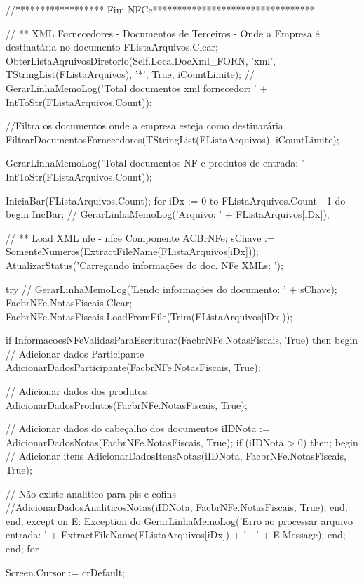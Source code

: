       //****************** Fim NFCe*********************************



   // ** XML Fornecedores - Documentos de Terceiros - Onde a Empresa é destinatária no documento
   FListaArquivos.Clear;
   ObterListaAqruivosDiretorio(Self.LocalDocXml_FORN, 'xml', TStringList(FListaArquivos), '*', True, iCountLimite);
 //  GerarLinhaMemoLog('Total documentos xml fornecedor: ' + IntToStr(FListaArquivos.Count));

   //Filtra os documentos onde a empresa esteja como destinarária
   FiltrarDocumentosFornecedores(TStringList(FListaArquivos), iCountLimite);

   GerarLinhaMemoLog('Total documentos NF-e produtos de entrada: ' + IntToStr(FListaArquivos.Count));


   IniciaBar(FListaArquivos.Count);
   for iDx := 0 to FListaArquivos.Count - 1 do
     begin
        IncBar;
       // GerarLinhaMemoLog('Arquivo: ' + FListaArquivos[iDx]);

        // ** Load XML nfe - nfce Componente ACBrNFe;
        sChave := SomenteNumeros(ExtractFileName(FListaArquivos[iDx]));
        AtualizarStatus('Carregando informações do doc. NFe XMLs: ');

        try
          // GerarLinhaMemoLog('Lendo informações do documento: ' + sChave);
           FacbrNFe.NotasFiscais.Clear;
           FacbrNFe.NotasFiscais.LoadFromFile(Trim(FListaArquivos[iDx]));

           if InformacoesNFeValidasParaEscriturar(FacbrNFe.NotasFiscais, True) then
              begin
                 // Adicionar dados Participante
                 AdicionarDadosParticipante(FacbrNFe.NotasFiscais, True);

                 // Adicionar dados dos produtos
                 AdicionarDadosProdutos(FacbrNFe.NotasFiscais, True);

                 // Adicionar dados do cabeçalho dos documentos
                 iIDNota := AdicionarDadosNotas(FacbrNFe.NotasFiscais, True);
                 if (iIDNota > 0) then;
                    begin
                       // Adicionar itens
                       AdicionarDadosItensNotas(iIDNota, FacbrNFe.NotasFiscais, True);

                       // Não existe analitico para pis e cofins
                       //AdicionarDadosAnaliticosNotas(iIDNota, FacbrNFe.NotasFiscais, True);
                    end;
              end;
        except
           on E: Exception do
              GerarLinhaMemoLog('Erro ao processar arquivo entrada: ' + ExtractFileName(FListaArquivos[iDx]) + ' - ' + E.Message);
        end;
     end; {for}


  Screen.Cursor := crDefault;

